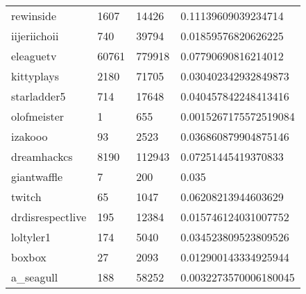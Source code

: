 \documentclass[final]{report} %
\begin{document}
\begin{appendices}
\begin{table}[h]
\begin{tabular}{llll}
rewinside        & 1607   & 14426   & 0.11139609039234714   \\
iijeriichoii     & 740    & 39794   & 0.01859576820626225   \\
eleaguetv        & 60761  & 779918  & 0.07790690816214012   \\
kittyplays       & 2180   & 71705   & 0.030402342932849873  \\
starladder5      & 714    & 17648   & 0.040457842248413416  \\
olofmeister      & 1      & 655     & 0.0015267175572519084 \\
izakooo          & 93     & 2523    & 0.036860879904875146  \\
dreamhackcs      & 8190   & 112943  & 0.07251445419370833   \\
giantwaffle      & 7      & 200     & 0.035                 \\
twitch           & 65     & 1047    & 0.06208213944603629   \\
drdisrespectlive & 195    & 12384   & 0.015746124031007752  \\
loltyler1        & 174    & 5040    & 0.034523809523809526  \\
boxbox           & 27     & 2093    & 0.012900143334925944  \\
a\_seagull       & 188    & 58252   & 0.0032273570006180045 \\
\end{tabular}
\end{table}






\end{appendices}
\end{document}
